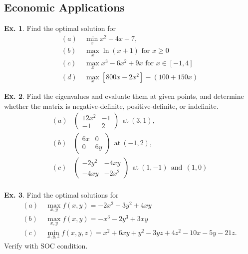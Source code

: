 \documentclass[11pt,a4paper]{book}
\theoremstyle{definition}\newtheorem{definition}{Definition}
\theoremstyle{definition}\newtheorem{fact}{Fact}
\theoremstyle{definition}\newtheorem{remark}{Remark}
\theoremstyle{definition}\newtheorem{ex}{Ex.}
\theoremstyle{definition}\newtheorem{project}{Project}
\theoremstyle{definition}\newtheorem{problem}{Problem}
\theoremstyle{definition}\newtheorem{example}{Example}
\numberwithin{theorem}{section}
\numberwithin{corollary}{chapter}
\numberwithin{assumption}{chapter}
\numberwithin{definition}{chapter}
\numberwithin{prop}{chapter}
\numberwithin{notation}{chapter}
\numberwithin{problem}{chapter}
\numberwithin{example}{chapter}
\numberwithin{fact}{chapter}
\numberwithin{ex}{chapter}
\begin{document}
	\subsection{Economic Applications}
	
	\begin{ex}
		Find the optimal solution for
		\begin{align*}
			(a) & \ \min_x x^2 - 4x + 7, \\
			(b) & \ \max_x \ln(x+1) \text{ for $x \geq 0$} \\
			(c) & \ \max_x x^3 - 6x^2 + 9x \text{ for $x \in [-1,4]$} \\
			(d) & \ \max_x [800x - 2x^2] - (100 + 150 x)
		\end{align*}
	\end{ex}
	
	\begin{ex}
		Find the eigenvalues and evaluate them at given points, and determine whether the matrix is negative-definite, positive-definite, or indefinite.
		\begin{align*}
			(a) &\begin{pmatrix}
				12 x^2 & -1   \\ -1 & 2
			\end{pmatrix} \ \ \text{at} \ (3,1), \\
			(b) &\begin{pmatrix}
				6x     & 0    \\ 0 & 6y
			\end{pmatrix} \ \ \text{at} \ (-1,2), \\
			(c) &\begin{pmatrix}
				-2y^2  & -4xy \\ -4xy & -2 x^2
			\end{pmatrix} \ \ \text{at} \ (1,-1) \ \ \text{and} \ \ (1,0) \\
		\end{align*}
	\end{ex}
	

	
	\begin{ex}
		Find the optimal solutions for
		\begin{align*}
			(a) &\ \max_{x,y} f(x,y) = -2 x^2 - 3 y^2 + 4xy \\
			(b) &\ \max_{x,y} f(x,y) = -x^3 - 2y^3 + 3xy \\
			(c) &\ \min_{x,y,z} f(x,y,z) = x^2 + 6xy + y^2 - 3yz + 4z^2 - 10x - 5y - 21z.
		\end{align*}
		Verify with SOC condition.
	\end{ex}
\end{document}
